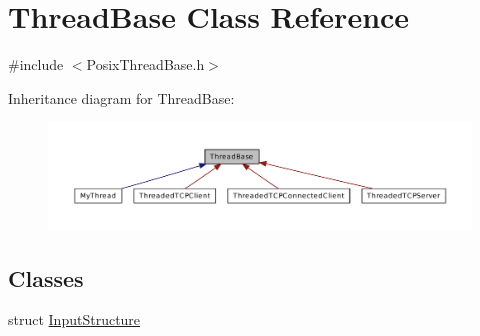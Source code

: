 \hypertarget{class_thread_base}{\section{Thread\-Base Class Reference}
\label{class_thread_base}
}


{\ttfamily \#include $<$Posix\-Thread\-Base.\-h$>$}



Inheritance diagram for Thread\-Base\-:\nopagebreak
\begin{figure}[H]
\begin{center}
\leavevmode
\includegraphics[width=350pt]{class_thread_base__inherit__graph}
\end{center}
\end{figure}
\subsection*{Classes}
\begin{DoxyCompactItemize}
\item 
struct \hyperlink{struct_thread_base_1_1_input_structure}{Input\-Structure}
\end{DoxyCompactItemize}
